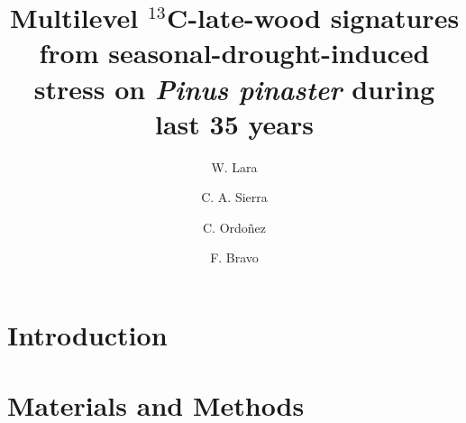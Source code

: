 \documentclass[review,authoryear]{elsarticle}
\begin{document}
\begin{frontmatter}
\title{\textbf{Multilevel $^{13}$C-late-wood signatures from seasonal-drought-induced
    stress on \textit{Pinus pinaster} during last 35 years }}

\author[aut1,aut2]{W. Lara}
\author[aut1]{C. A.  Sierra }
\author[aut1]{C. Ordo{\~n}ez}
\author[aut1]{F. Bravo}


\address[aut1]{Sustainable Forest Management Research
  Institute,UVA-INIA, Avenida Madrid, s/n, 34071, Palencia, Spain}

\address[focal]{Department of Biogeochemical Processes, Max Planck
  Institute for Biogeochemistry, Hans-Kn\"oll-Stra\ss e 10, 07745,
  Jena, Germany}

\address[aut2]{Research Center on Ecosystems and Global Change,
  Carbono \& Bosques $($C\&B$)$, Calle 51A, N$^o$ 72-23, Int: 601,
  050034, Medell{\'i}n, Colombia}

\begin{abstract}
\end{abstract}
\begin{keyword}
\end{keyword}
\end{frontmatter}

\linenumbers
\section{Introduction}\label{sec:intro}



\section{Materials and Methods}
\end{document}
